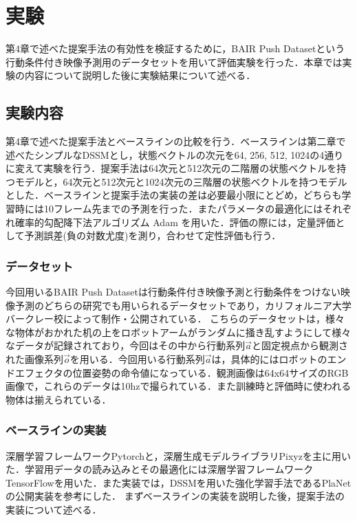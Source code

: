 \documentclass[10pt, twocolumn]{jarticle}
\begin{document}
\section{実験}
\label{chap:experiment}
第4章で述べた提案手法の有効性を検証するために，BAIR Push Dataset\cite{ebert2017selfsupervised}という行動条件付き映像予測用のデータセットを用いて評価実験を行った．本章では実験の内容について説明した後に実験結果について述べる．

\subsection{実験内容}
第4章で述べた提案手法とベースラインの比較を行う．ベースラインは第二章で述べたシンプルなDSSMとし，状態ベクトルの次元を64, 256, 512, 1024の4通りに変えて実験を行う．提案手法は64次元と512次元の二階層の状態ベクトルを持つモデルと，64次元と512次元と1024次元の三階層の状態ベクトルを持つモデルとした．ベースラインと提案手法の実装の差は必要最小限にとどめ，どちらも学習時には10フレーム先までの予測を行った．またパラメータの最適化にはそれぞれ確率的勾配降下法アルゴリズム Adam\cite{kingma2014adam} を用いた．評価の際には，定量評価として予測誤差(負の対数尤度)を測り，合わせて定性評価も行う．

\subsubsection{データセット}

今回用いるBAIR Push Dataset\cite{ebert2017selfsupervised}は行動条件付き映像予測と行動条件をつけない映像予測のどちらの研究でも用いられるデータセットであり，カリフォルニア大学バークレー校によって制作・公開されている．
こちらのデータセットは，様々な物体がおかれた机の上をロボットアームがランダムに掻き乱すようにして様々なデータが記録されており，今回はその中から行動系列$\vec{a}$と固定視点から観測された画像系列$\vec{o}$を用いる．今回用いる行動系列$\vec{a}$は，具体的にはロボットのエンドエフェクタの位置姿勢の命令値になっている．観測画像は64x64サイズのRGB画像で，これらのデータは10hzで撮られている．また訓練時と評価時に使われる物体は揃えられている．

\subsubsection{ベースラインの実装}
深層学習フレームワークPytorch\cite{pytorch}と，深層生成モデルライブラリPixyz\cite{pixyz}を主に用いた．学習用データの読み込みとその最適化には深層学習フレームワークTensorFlow\cite{tensorflow}を用いた．また実装では，DSSMを用いた強化学習手法であるPlaNetの公開実装\cite{planet}を参考にした．
まずベースラインの実装を説明した後，提案手法の実装について述べる．
\end{document}
